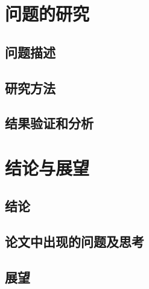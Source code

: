\chapter{问题的研究}

\section{问题描述}
\section{研究方法}
\section{结果验证和分析}

\chapter{结论与展望}

\section{结论}
\section{论文中出现的问题及思考}
\section{展望}

\printbibliography[heading=chapbib]